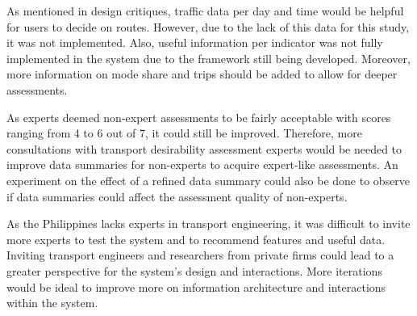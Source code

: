 \documentclass{sigchi}
\begin{document}
As mentioned in design critiques, traffic data per day and time would be helpful for users to decide on routes. However, due to the lack of this data for this study, it was not implemented. Also, useful information per indicator was not fully implemented in the system due to the framework still being developed. Moreover, more information on mode share and trips should be added to allow for deeper assessments.

As experts deemed non-expert assessments to be fairly acceptable with scores ranging from 4 to 6 out of 7, it could still be improved. Therefore, more consultations with transport desirability assessment experts would be needed to improve data summaries for non-experts to acquire expert-like assessments. An experiment on the effect of a refined data summary could also be done to observe if data summaries could affect the assessment quality of non-experts.

As the Philippines lacks experts in transport engineering, it was difficult to invite more experts to test the system and to recommend features and useful data. Inviting transport engineers and researchers from private firms could lead to a greater perspective for the system’s design and interactions. More iterations would be ideal to improve more on information architecture and interactions within the system.  













\end{document}
